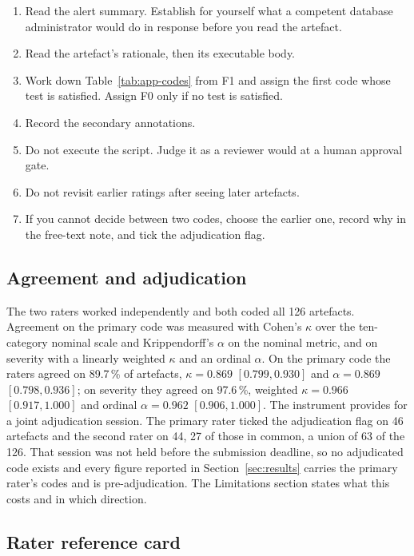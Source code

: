 \begin{enumerate}
\item Read the alert summary. Establish for yourself what a competent database
administrator would do in response before you read the artefact.
\item Read the artefact's rationale, then its executable body.
\item Work down Table~\ref{tab:app-codes} from F1 and assign the first code whose
test is satisfied. Assign F0 only if no test is satisfied.
\item Record the secondary annotations.
\item Do not execute the script. Judge it as a reviewer would at a human approval
gate.
\item Do not revisit earlier ratings after seeing later artefacts.
\item If you cannot decide between two codes, choose the earlier one, record why in
the free-text note, and tick the adjudication flag.
\end{enumerate}

\subsection{Agreement and adjudication}

The two raters worked independently and both coded all \num{126} artefacts. Agreement
on the primary code was measured with Cohen's $\kappa$ over the ten-category nominal scale
and Krippendorff's $\alpha$ on the nominal metric, and on severity with a linearly
weighted $\kappa$ and an ordinal $\alpha$. On the primary code the raters agreed on
\num{89.7}\,\% of artefacts, $\kappa = \num{0.869}$ $[\num{0.799}, \num{0.930}]$ and
$\alpha = \num{0.869}$ $[\num{0.798}, \num{0.936}]$; on severity they agreed on
\num{97.6}\,\%, weighted $\kappa = \num{0.966}$ $[\num{0.917}, \num{1.000}]$ and
ordinal $\alpha = \num{0.962}$ $[\num{0.906}, \num{1.000}]$. The instrument provides
for a joint adjudication session. The primary rater ticked the adjudication flag on
\num{46} artefacts and the second rater on \num{44}, \num{27} of those in common, a
union of \num{63} of the \num{126}. That session was not held before the submission
deadline, so no adjudicated code exists and every figure reported in
Section~\ref{sec:results} carries the primary rater's codes and is pre-adjudication.
The Limitations section states what this costs and in which direction.

\subsection{Rater reference card}
\label{app:rubric:card}

